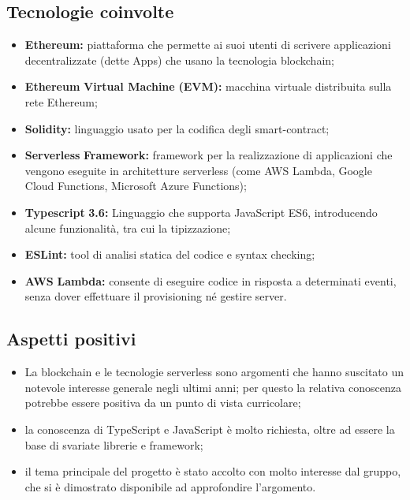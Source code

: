 \subsection{Tecnologie coinvolte}
	\begin{itemize}
		\item \textbf{Ethereum}\textbf{:} piattaforma che permette ai suoi utenti di scrivere applicazioni decentralizzate (dette \DJ Apps) che usano la tecnologia blockchain;
		\item \textbf{Ethereum} \textbf{Virtual Machine} \textbf{(EVM}\textbf{):} macchina virtuale distribuita sulla rete Ethereum; 
		\item \textbf{Solidity}\textbf{:} linguaggio usato per la codifica degli smart-contract; 
		\item \textbf{Serverless} \textbf{Framework}\textbf{:} framework per la realizzazione di applicazioni che vengono eseguite in architetture serverless (come AWS Lambda, Google Cloud Functions, Microsoft Azure Functions); 
		\item \textbf{Typescript} \textbf{3.6:} Linguaggio che supporta JavaScript ES6, introducendo alcune funzionalità, tra cui la tipizzazione;
		\item \textbf{ESLint}\textbf{:} tool di analisi statica del codice e syntax checking; 
		\item \textbf{AWS} \textbf{Lambda:} consente di eseguire codice in risposta a determinati eventi, senza dover effettuare il provisioning né gestire server.
	\end{itemize}

\subsection{Aspetti positivi}
	\begin{itemize}
		\item La blockchain e le tecnologie serverless sono argomenti che hanno suscitato un notevole interesse generale negli ultimi anni; per questo la relativa conoscenza potrebbe essere positiva da un punto di vista curricolare; 
		\item la conoscenza di TypeScript e JavaScript è molto richiesta, oltre ad essere la base di svariate librerie e framework; 
		\item il tema principale del progetto è stato accolto con molto interesse dal gruppo, che si è dimostrato disponibile ad approfondire l'argomento. 
	\end{itemize}

